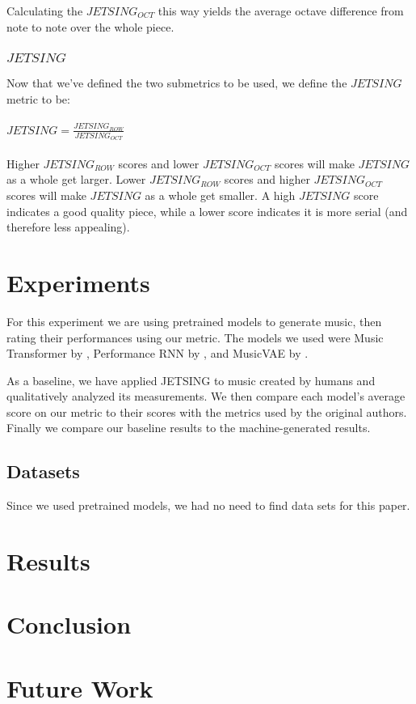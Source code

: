 \documentclass[11pt]{article}
\begin{document}
Calculating the $JETSING_{OCT}$ this way yields the average octave difference from note to note over the whole piece.

\subsubsection{$JETSING$}
Now that we've defined the two submetrics to be used, we define the $JETSING$ metric to be:
\\ \\
\LARGE
$ JETSING = \frac{JETSING_{ROW}}{JETSING_{OCT}}$
\normalsize
\\ \\
\indent Higher $JETSING_{ROW}$ scores and lower $JETSING_{OCT}$ scores will make $JETSING$ as a whole get larger.
Lower $JETSING_{ROW}$ scores and higher $JETSING_{OCT}$ scores will make $JETSING$ as a whole get smaller.
A high $JETSING$ score indicates a good quality piece, while a lower score indicates it is more serial (and therefore less appealing).

\section{Experiments}
For this experiment we are using pretrained models to generate music, then rating their performances using our metric.
The models we used were Music Transformer by \cite{huang2018music}, Performance RNN by \cite{performance-rnn-2017}, and MusicVAE by \cite{musicVAE}.

As a baseline, we have applied JETSING to music created by humans and qualitatively analyzed its measurements.
We then compare each model's average score on our metric to their scores with the metrics used by the original authors.
Finally we compare our baseline results to the machine-generated results.

\subsection{Datasets}
Since we used pretrained models, we had no need to find data sets for this paper.

\section{Results}

\section{Conclusion}

\section{Future Work}




\nocite{huang2018music, kotecha2018generating, vaswani2017attention, zhao2020verticalhorizontal, performance-rnn-2017, musicVAE}
\end{document}
